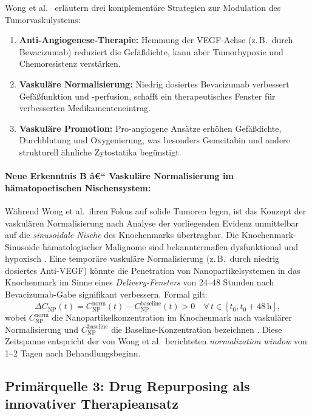 ﻿\documentclass[12pt,a4paper]{article}
\theoremstyle{definition}
\begin{document}
Wong et al.\ \cite{wong2016} erläutern drei komplementäre Strategien zur Modulation
des Tumorvaskulystems:
\begin{enumerate}
  \item \textbf{Anti-Angiogenese-Therapie:} Hemmung der VEGF-Achse (z.\,B.\ durch
        Bevacizumab) reduziert die Gefäßdichte, kann aber Tumorhypoxie und
        Chemoresistenz verstärken.
  \item \textbf{Vaskuläre Normalisierung:} Niedrig dosiertes Bevacizumab verbessert
        Gefäßfunktion und -perfusion, schafft ein therapeutisches Fenster für
        verbesserten Medikamenteneintrag.
  \item \textbf{Vaskuläre Promotion:} Pro-angiogene Ansätze erhöhen Gefäßdichte,
        Durchblutung und Oxygenierung, was besonders Gemcitabin und andere
        strukturell ähnliche Zytostatika begünstigt.
\end{enumerate}

\paragraph{Neue Erkenntnis B â€“ Vaskuläre Normalisierung im hämatopoetischen Nischensystem:}
Während Wong et al.\ ihren Fokus auf solide Tumoren legen, ist das Konzept der
vaskulären Normalisierung nach Analyse der vorliegenden Evidenz unmittelbar auf die
\emph{sinusoidale Nische} des Knochenmarks übertragbar. Die Knochenmark-Sinusoide
hämatologischer Malignome sind bekanntermaßen dysfunktional und hypoxisch
\cite{adeyemi2025}. Eine temporäre vaskuläre Normalisierung (z.\,B.\ durch niedrig
dosiertes Anti-VEGF) könnte die Penetration von Nanopartikelsystemen in das
Knochenmark im Sinne eines \emph{Delivery-Fensters} von 24--48 Stunden nach
Bevacizumab-Gabe signifikant verbessern. Formal gilt:
\begin{equation}
  \Delta C_{\mathrm{NP}}(t) = C_{\mathrm{NP}}^{\mathrm{norm}}(t)
                             - C_{\mathrm{NP}}^{\mathrm{baseline}}(t) > 0
  \quad \forall\, t \in [t_0, t_0 + 48\,\mathrm{h}],
  \label{eq:delivery_window}
\end{equation}
wobei $C_{\mathrm{NP}}^{\mathrm{norm}}$ die Nanopartikelkonzentration im Knochenmark
nach vaskulärer Normalisierung und $C_{\mathrm{NP}}^{\mathrm{baseline}}$ die
Baseline-Konzentration bezeichnen \cite{wong2016}. Diese Zeitspanne entspricht der
von Wong et al.\ berichteten \emph{normalization window} von 1--2 Tagen nach
Behandlungsbeginn.

\subsection{Primärquelle 3: Drug Repurposing als innovativer Therapieansatz}
\label{subsec:mccabe}
\end{document}
